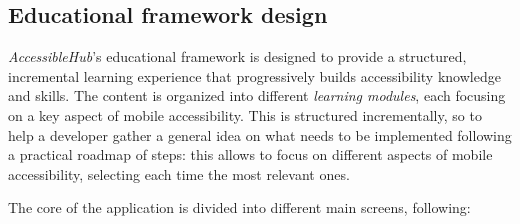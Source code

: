 \subsection{Educational framework design}

\textit{AccessibleHub}'s educational framework is designed to provide a structured, incremental learning experience that progressively builds accessibility knowledge and skills. The content is organized into different \textit{learning modules}, each focusing on a key aspect of mobile accessibility. This is structured incrementally, so to help a developer gather a general idea on what needs to be implemented following a practical roadmap of steps: this allows to focus on different aspects of mobile accessibility, selecting each time the most relevant ones.

The core of the application is divided into different main screens, following:

